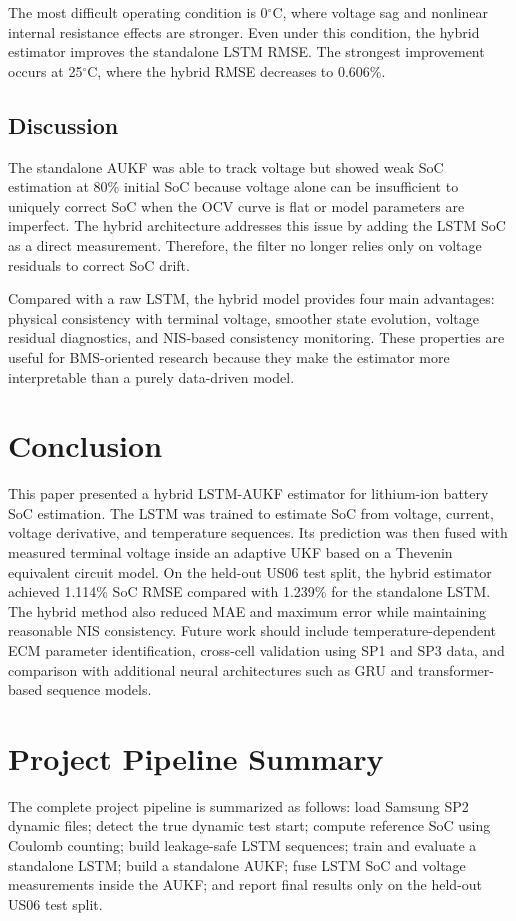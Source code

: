 \documentclass[lettersize,journal]{IEEEtran}
\begin{document}
The most difficult operating condition is 0$^\circ$C, where voltage sag and nonlinear internal resistance effects are stronger. Even under this condition, the hybrid estimator improves the standalone LSTM RMSE. The strongest improvement occurs at 25$^\circ$C, where the hybrid RMSE decreases to 0.606\%.

\subsection{Discussion}
The standalone AUKF was able to track voltage but showed weak SoC estimation at 80\% initial SoC because voltage alone can be insufficient to uniquely correct SoC when the OCV curve is flat or model parameters are imperfect. The hybrid architecture addresses this issue by adding the LSTM SoC as a direct measurement. Therefore, the filter no longer relies only on voltage residuals to correct SoC drift.

Compared with a raw LSTM, the hybrid model provides four main advantages: physical consistency with terminal voltage, smoother state evolution, voltage residual diagnostics, and NIS-based consistency monitoring. These properties are useful for BMS-oriented research because they make the estimator more interpretable than a purely data-driven model.

\section{Conclusion}
This paper presented a hybrid LSTM-AUKF estimator for lithium-ion battery SoC estimation. The LSTM was trained to estimate SoC from voltage, current, voltage derivative, and temperature sequences. Its prediction was then fused with measured terminal voltage inside an adaptive UKF based on a Thevenin equivalent circuit model. On the held-out US06 test split, the hybrid estimator achieved 1.114\% SoC RMSE compared with 1.239\% for the standalone LSTM. The hybrid method also reduced MAE and maximum error while maintaining reasonable NIS consistency. Future work should include temperature-dependent ECM parameter identification, cross-cell validation using SP1 and SP3 data, and comparison with additional neural architectures such as GRU and transformer-based sequence models.

\appendices
\section{Project Pipeline Summary}
The complete project pipeline is summarized as follows: load Samsung SP2 dynamic files; detect the true dynamic test start; compute reference SoC using Coulomb counting; build leakage-safe LSTM sequences; train and evaluate a standalone LSTM; build a standalone AUKF; fuse LSTM SoC and voltage measurements inside the AUKF; and report final results only on the held-out US06 test split.
\end{document}
